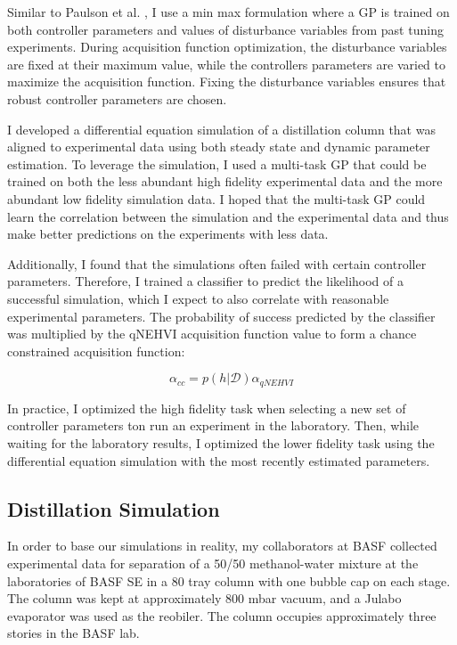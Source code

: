 Similar to Paulson et al. \cite{Paulson2022}, I use a min max formulation where a GP is trained on both controller parameters and values of disturbance variables from past tuning experiments. During acquisition function optimization, the disturbance variables are fixed at their maximum value, while the controllers parameters are varied to maximize the acquisition function. Fixing the disturbance variables ensures that robust controller parameters are chosen.

I developed a differential equation simulation of a distillation column that was aligned to experimental data using both steady state and dynamic parameter estimation. To leverage the simulation, I used a multi-task GP that could be trained on both the less abundant high fidelity experimental data and the more abundant low fidelity simulation data. I hoped that the multi-task GP could learn the correlation between the simulation and the experimental data and thus make better predictions on the experiments with less data.

Additionally, I found that the simulations often failed with certain controller parameters. Therefore, I trained a classifier to predict the likelihood of a successful simulation, which I expect to also correlate with reasonable experimental parameters. The probability of success predicted by the classifier was multiplied by the qNEHVI acquisition function value to form a chance constrained acquisition function:

\begin{equation}
    \alpha_{cc} = p(h \vert \mathcal D) \alpha_{qNEHVI}
\end{equation} 

In practice, I optimized the high fidelity task when selecting  a new set of controller parameters ton run an experiment in the laboratory. Then, while waiting for the laboratory results, I optimized the lower fidelity task using the differential equation simulation with the most recently estimated parameters. 

\subsection{Distillation Simulation}\label{sec:distillation_model}

In order to base our simulations in reality, my collaborators at BASF collected experimental data for separation of a 50/50 methanol-water mixture at the laboratories of BASF SE in a 80 tray column with one bubble cap on each stage. The column was kept at approximately 800 mbar vacuum, and a Julabo evaporator was used as the reobiler. The column occupies approximately three stories in the BASF lab.  

